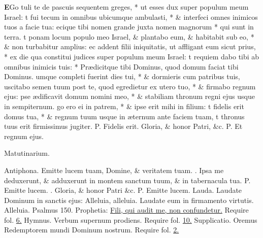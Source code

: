 \documentclass[letter,11pt]{book}
\makeatletter
\DeclareRobustCommand{\Vbar}{\vers@resp{-0.1em}{V}}
\newcommand{\vers@resp@sym}{\raisebox{0.2ex}{\rotatebox[origin=c]{-20}{$\m@th\rceil$}}}
\newcommand{\vers@resp}[2]{%
  {\ooalign{\hidewidth\kern#1\vers@resp@sym\hidewidth\cr#2\cr}}%
}%
\def\P{\color{Red} P. \color{black}}
\def\V{\color{Red} \Vbar . \color{black}}
\makeatother
\begin{document}
\begin{multicols}{2}
\lettrine[lines=2]{\bfseries \color{Red} E}{}Go tuli te de pascuis sequentem greges, * ut esses dux super populum meum Israel:
t fui tecum in omnibus ubicumque ambulasti, * \& interfeci omnes inimicos tuos a facie tua:
ecique tibi nomen grande juxta nomen magnorum * qui sunt in terra.
t ponam locum populo meo Israel, \& plantabo eum, \& habitabit sub eo, * \& non turbabitur amplius:
ec addent filii iniquitatis, ut affligant eum sicut prius, * ex die qua constitui judices super populum meum Israel:
t requiem dabo tibi ab omnibus inimicis tuis: * Pr\ae dicitque tibi Dominus, quod domum faciat tibi Dominus.
umque completi fuerint dies tui, * \& dormieris cum patribus tuis,
uscitabo semen tuum post te, quod egredietur ex utero tuo, * \& firmabo regnum ejus:
pse \ae dificavit domum nomini meo, * \& stabiliam thronum regni ejus usque in sempiternum.
go ero ei in patrem, * \& ipse erit mihi in filium:
t fidelis erit domus tua, * \& regnum tuum usque in \ae ternum ante faciem tuam,
t thronus tuus erit firmissimus jugiter.
\newline \P Fidelis erit. Gloria, \& honor Patri, \&c.
\newline \P Et regnum ejus.
\vspace{-.75em} \begin{center} \color{Red} Matutinarium. \end{center} \vspace{-.75em}
\par \noindent \color{Red} Antiphona. \color{black} Emitte lucem tuam, Domine, \& veritatem tuam. \V Ipsa me deduxerunt, \& adduxerunt in montem sanctum tuum, \& in tabernacula tua. \P Emitte lucem. \V Gloria,
\& honor Patri \&c. \P Emitte lucem.
\newline \color{Red} Lauda. \color{black} Laudate Dominum in sanctis ejus: Alleluia, alleluia. Laudate eum in firmamento virtutis. Alleluia. \color{Red} Psalmus 150. Prophetia: \color{black} \hyperlink{sirach.24}{Fili, qui audit me, non confundetur.} {\color{Red} Require fol.} \hyperlink{page.6}{6.} \color{Red} Hymnus. \color{black} Verbum supernum prodiens. {\color{Red} Require fol.} \hyperlink{page.10}{10.} {\color{Red} Supplicatio.} Oremus Redemptorem mundi Dominum nostrum. {\color{Red} Require fol.} \hyperlink{Supplicatio}{2.}

\end{multicols}
\end{document}
